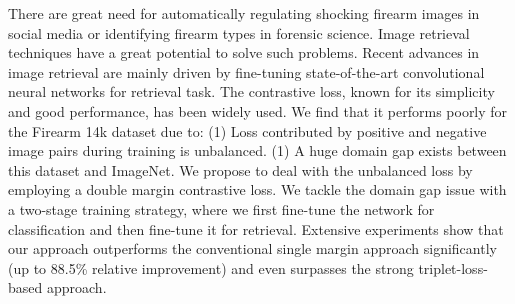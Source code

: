 \begin{enumerate}
There are great need for automatically regulating shocking firearm images in social media or identifying firearm types in forensic science. Image retrieval techniques have a great potential to solve such problems. Recent advances in image retrieval are mainly driven by fine-tuning state-of-the-art convolutional neural networks for retrieval task. The contrastive loss, known for its simplicity and good performance, has been widely used. We find that it performs poorly for the Firearm 14k dataset due to: (1) Loss contributed by positive and negative image pairs during training is unbalanced. (1) A huge domain gap exists between this dataset and ImageNet. We propose to deal with the unbalanced loss by employing a double margin contrastive loss. We tackle the domain gap issue with a two-stage training strategy, where we first fine-tune the network for classification and then fine-tune it for retrieval. Extensive experiments show that our approach outperforms the conventional single margin approach significantly (up to 88.5\% relative improvement) and even surpasses the strong triplet-loss-based approach.

\end{enumerate}



